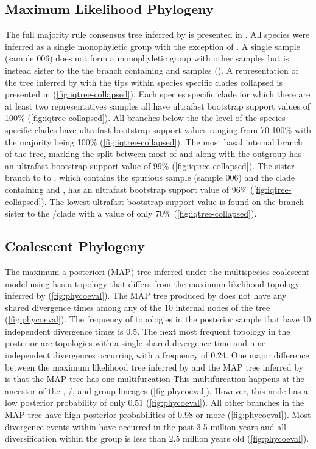 \subsection{Maximum Likelihood Phylogeny}
The full majority rule consensus tree inferred by \iqtree is presented in \iqtreefigs. 
All species were inferred as a single monophyletic group with the exception 
of \fowl. 
A single \fowl sample (sample 006) does not form a monophyletic group with other 
\fowl samples but is instead sister to the the branch containing \wood and \fowl samples (\iqtreefigs).
A representation of the tree inferred by \iqtree with the tips within
species specific clades collapsed is presented in (\cref{fig:iqtree-collapsed}). 
Each species specific clade for which there are at least two representatives
samples all have ultrafast bootstrap support values of 100\% (\cref{fig:iqtree-collapsed}).
All branches below the the level of the species specific clades have ultrafast 
bootstrap support values ranging from 70-100\% with the majority being 100\% (\cref{fig:iqtree-collapsed}).
The most basal internal branch of the tree, marking the split between most of \anaxyrus
and \punctatus along with the outgroup \nebulifer has an ultrafast bootstrap 
support value of 99\% (\cref{fig:iqtree-collapsed}).
The sister branch to to \terr, which contains the spurious \fowl sample (sample 006)
and the clade containing \fowl and \wood, has an ultrafast bootstrap support 
value of 96\% (\cref{fig:iqtree-collapsed}).
The lowest ultrafast bootstrap support value is found on the branch sister 
to the \cognatus/\speciosus clade with a value of only 70\% (\cref{fig:iqtree-collapsed}).

\subsection{Coalescent Phylogeny}
The maximum a posteriori (MAP) tree inferred under the multispecies coalescent
model using \phycoeval has a topology that differs from the maximum likelihood topology 
inferred by \iqtree (\cref{fig:phycoeval}).
The MAP tree produced by \phycoeval does not have any shared divergence times 
among any of the 10 internal nodes of the tree (\cref{fig:phycoeval}).
The frequency of topologies in the posterior sample that have 10 independent 
divergence times is 0.5.
The next most frequent topology in the posterior are topologies with a single 
shared divergence time and nine independent divergences occurring with a frequency
of 0.24.
One major difference between the maximum likelihood tree inferred by \iqtree and 
the MAP tree inferred by \phycoeval is that the MAP tree has one multifurcation \. 
This multifurcation happens at the ancestor of the \quercicus, \speciosus/\cognatus,
and \amer group lineages (\cref{fig:phycoeval}).
However, this node has a low posterior probability of only 0.51 (\cref{fig:phycoeval}). 
All other branches in the MAP tree have high posterior probabilities of 0.98 or more (\cref{fig:phycoeval}). 
Most divergence events within \anaxyrus have occurred in the past 3.5 million 
years and all diversification within the \amer group is less than 2.5   
million years old (\cref{fig:phycoeval}).

